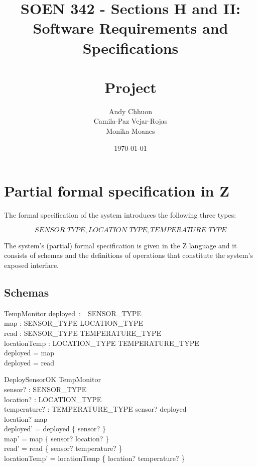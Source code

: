 \documentclass[12pt]{article}
\title{SOEN 342 - Sections H and II:\\Software Requirements and Specifications\\
	\ \\
	Project}
\author{Andy Chhuon \\ Camila-Paz Vejar-Rojas\\ Monika Moanes}
\date{\today}
\begin{document}
		\maketitle
		
		\newpage

		\section{Partial formal specification in Z}
		
		The formal specification of the system introduces the following three types:
		
		\[ SENSOR\_TYPE, LOCATION\_TYPE, TEMPERATURE\_TYPE  \]
		
		\noindent The system's (partial) formal specification is given in the Z language and it consists of schemas and the definitions of operations that constitute the system's exposed interface.
		
	
		\subsection{Schemas}
		
		
		\begin{schema}{TempMonitor}
			deployed~:~~SENSOR\_TYPE\\
			map : SENSOR\_TYPE \nrightarrow LOCATION\_TYPE\\
			read : SENSOR\_TYPE  \nrightarrow TEMPERATURE\_TYPE\\
   			locationTemp : LOCATION\_TYPE  \nrightarrow TEMPERATURE\_TYPE\\
			\where
			deployed = \dom map\\
			deployed = \dom read
		\end{schema}
		
		
		
		\begin{schema}{DeploySensorOK}
			\Delta TempMonitor\\
			sensor? : SENSOR\_TYPE\\
			location? : LOCATION\_TYPE\\
			temperature? : TEMPERATURE\_TYPE
			\where
			sensor? \notin deployed\\
			location? \notin \ran map\\
			deployed' = deployed \cup \{ sensor? \}\\
			map' = map \cup \{ sensor? \mapsto location? \}\\
			read' = read \cup \{ sensor? \mapsto temperature? \}\\
   			locationTemp' = locationTemp \cup \{ location? \mapsto temperature? \}
		\end{schema}
		
\end{document}
